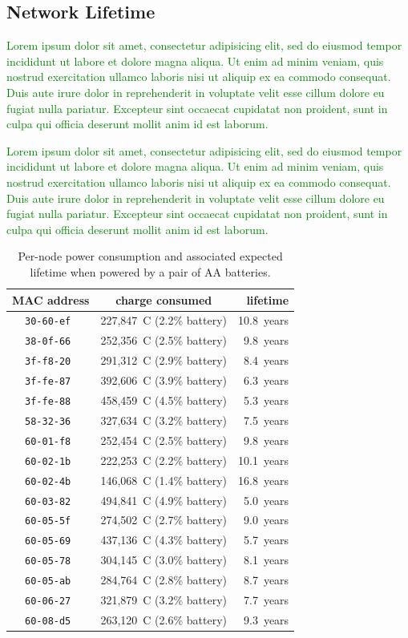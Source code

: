 \documentclass{elsarticle}
\newcommand{\lorem}          {\textcolor{green}{Lorem ipsum dolor sit amet, consectetur adipisicing elit, sed do eiusmod tempor incididunt ut labore et dolore magna aliqua. Ut enim ad minim veniam, quis nostrud exercitation ullamco laboris nisi ut aliquip ex ea commodo consequat. Duis aute irure dolor in reprehenderit in voluptate velit esse cillum dolore eu fugiat nulla pariatur. Excepteur sint occaecat cupidatat non proident, sunt in culpa qui officia deserunt mollit anim id est laborum.}}
\begin{document}
\subsection{Network Lifetime}
\label{sec:lifetime}


\lorem


\lorem

\begin{table}
    \begin{tabular}{|c|c|r|}
        \hline
        MAC address    & charge consumed           &   lifetime \\
        \hline
        \tt{30-60-ef}  & 227,847~C (2.2\% battery) & 10.8~years \\
        \tt{38-0f-66}  & 252,356~C (2.5\% battery) &  9.8~years \\
        \tt{3f-f8-20}  & 291,312~C (2.9\% battery) &  8.4~years \\
        \tt{3f-fe-87}  & 392,606~C (3.9\% battery) &  6.3~years \\
        \tt{3f-fe-88}  & 458,459~C (4.5\% battery) &  5.3~years \\
        \tt{58-32-36}  & 327,634~C (3.2\% battery) &  7.5~years \\
        \tt{60-01-f8}  & 252,454~C (2.5\% battery) &  9.8~years \\
        \tt{60-02-1b}  & 222,253~C (2.2\% battery) & 10.1~years \\
        \tt{60-02-4b}  & 146,068~C (1.4\% battery) & 16.8~years \\
        \tt{60-03-82}  & 494,841~C (4.9\% battery) &  5.0~years \\
        \tt{60-05-5f}  & 274,502~C (2.7\% battery) &  9.0~years \\
        \tt{60-05-69}  & 437,136~C (4.3\% battery) &  5.7~years \\
        \tt{60-05-78}  & 304,145~C (3.0\% battery) &  8.1~years \\
        \tt{60-05-ab}  & 284,764~C (2.8\% battery) &  8.7~years \\
        \tt{60-06-27}  & 321,879~C (3.2\% battery) &  7.7~years \\
        \tt{60-08-d5}  & 263,120~C (2.6\% battery) &  9.3~years \\
        \hline
    \end{tabular}
    \caption{Per-node power consumption and associated expected lifetime when powered by a pair of AA batteries.}
    \label{tab:stats_charge}
\end{table}
\end{document}
